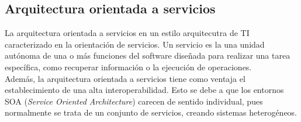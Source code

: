 \subsection{Arquitectura orientada a servicios}

La arquitectura orientada a servicios \cite{soa} en un estilo arquitecutra de TI caracterizado en la orientación de servicios. Un servicio es la una unidad autónoma de una o más funciones del software diseñada para realizar una tarea específica, como recuperar información o la ejecución de operaciones.
\\

Además, la arquitectura orientada a servicios tiene como ventaja el establecimiento de una alta interoperabilidad. Esto se debe a que los entornos SOA ({\it Service Oriented Architecture}) carecen de sentido individual, pues normalmente se trata de un conjunto de servicios, creando sistemas heterogéneos.